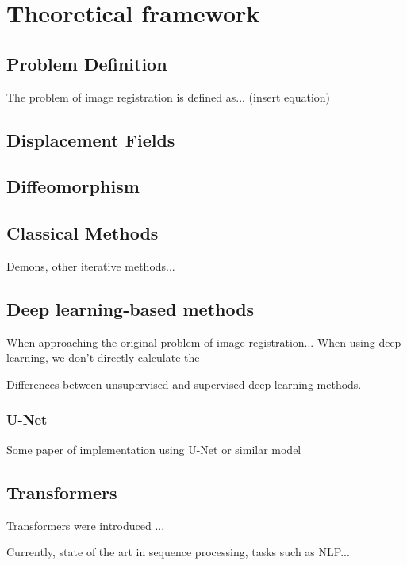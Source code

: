 
\cleardoublepage

\chapter{Theoretical framework}
\label{theoretical-framework}

\section{Problem Definition}
\label{problem-definition}
The problem of image registration is defined as... (insert equation)

\section{Displacement Fields}
\label{displacement-fields}

\section{Diffeomorphism}
\label{Diffeomorphism}

\section{Classical Methods}
\label{classical-methods}
Demons, other iterative methods...

\section{Deep learning-based methods}
\label{deep-learning-methods}
When approaching the original problem of image registration... When using deep learning, we don't directly calculate the 


Differences between unsupervised and supervised deep learning methods.

\subsection{U-Net}
\label{u-net}
Some paper of implementation using U-Net or similar model

\section{Transformers}
\label{transformers}
Transformers were introduced ...

Currently, state of the art in sequence processing, tasks such as NLP...


